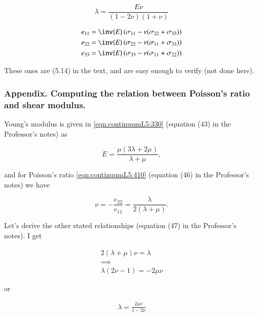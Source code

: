 \begin{equation}\label{eqn:continuumL5:450}
\lambda = \frac{E \nu}{(1 - 2 \nu)(1 + \nu)}
\end{equation}

\begin{align}\label{eqn:continuumL5:470}
e_{11} &= \inv{E}\left( \sigma_{11} - \nu(\sigma_{22} + \sigma_{33}) \right) \\
e_{22} &= \inv{E}\left( \sigma_{22} - \nu(\sigma_{11} + \sigma_{33}) \right) \\
e_{33} &= \inv{E}\left( \sigma_{33} - \nu(\sigma_{11} + \sigma_{22}) \right)
\end{align}

These ones are (5.14) in the text, and are easy enough to verify (not done here).

\subsubsection{Appendix.  Computing the relation between Poisson's ratio and shear modulus.}

Young's modulus is given in \ref{eqn:continuumL5:330} (equation (43) in the Professor's notes) as

\begin{equation}\label{eqn:continuumL6:490}
E = \frac{\mu(3 \lambda + 2 \mu)}{\lambda + \mu },
\end{equation}

and for Poisson's ratio \ref{eqn:continuumL5:410} (equation (46) in the Professor's notes) we have

\begin{equation}\label{eqn:continuumL6:510}
\nu = -\frac{e_{22}}{e_{11}} = \frac{\lambda}{2 (\lambda + \mu)}.
\end{equation}


Let's derive the other stated relationships (equation (47) in the Professor's notes).  I get

\begin{align*}
2 (\lambda + \mu) \nu = \lambda \\
\implies \\
\lambda ( 2 \nu - 1 ) = - 2\mu\nu
\end{align*}

or

\begin{align*}
\lambda = \frac{ 2 \mu \nu} { 1 - 2 \nu }
\end{align*}

